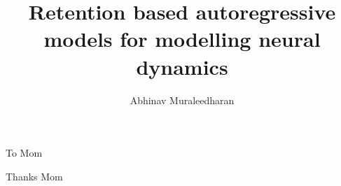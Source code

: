 \documentclass{ut-thesis}
\author{Abhinav Muraleedharan}
\title{Retention based autoregressive models for modelling neural dynamics}
\begin{document}
  \frontmatter
    \maketitle
    \begin{abstract}
      
    \end{abstract}
    \begin{dedication}
      To Mom
    \end{dedication}
    \begin{acknowledgements}
      Thanks Mom
    \end{acknowledgements}
    \tableofcontents
    \listoftables
    \listoffigures
  \mainmatter
    
    
    
  \appendix
    
  \backmatter
   
  
  \lipsum[1-6]
\end{document}
